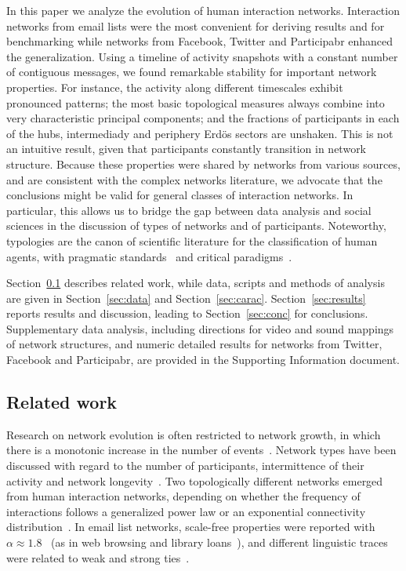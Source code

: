 \documentclass[%
	aip,
	jmp,%
	amsmath,amssymb,
	reprint,%
]{revtex4-1}
\begin{document}
In this paper we analyze the evolution of human interaction networks.
Interaction networks from email lists were the most convenient for deriving results and for benchmarking
while networks from Facebook, Twitter and Participabr enhanced the generalization.
Using a timeline of activity snapshots with a constant number of contiguous messages,
we found remarkable stability for important network properties.
For instance, the activity along different timescales exhibit pronounced patterns;
the most basic topological measures always combine into very characteristic principal components;
and the fractions of participants in each of the hubs, intermediady and periphery Erd\"os sectors
are unshaken.
This is not an intuitive result, given that participants constantly transition in network structure.
Because these properties were shared by networks from various sources,
and are consistent with the complex networks literature,
we advocate that the conclusions might be valid for general classes of interaction networks.
In particular, this allows us to 
bridge the gap between data analysis 
and social sciences in the discussion
of types of networks and of participants.
Noteworthy, typologies are the canon of scientific literature for the classification of human agents,
with pragmatic standards~\cite{myers} and critical paradigms~\cite{adorno,typCanon}. 

Section~\ref{sec:related} describes related work,
while data, scripts and methods of analysis are given in Section~\ref{sec:data} and Section~\ref{sec:carac}.
Section~\ref{sec:results} reports results and discussion, leading to Section~\ref{sec:conc} for conclusions.
Supplementary data analysis,
including directions for video and sound mappings of network structures,
and numeric detailed results for networks from Twitter, Facebook and Participabr,
are provided in the Supporting Information document.


\subsection{Related work}\label{sec:related}
Research on network evolution is often restricted to network growth, in which there is a monotonic increase in the number of events~\cite{barabasiEvo}.
Network types have been discussed with regard to the number of participants, intermittence of their activity and network longevity~\cite{barabasiEvo}. Two topologically different networks emerged from human interaction networks, depending on whether the frequency of interactions follows a generalized power law or an exponential connectivity distribution~\cite{barabasiTopologicalEv}. In email list networks, scale-free properties were reported with $\alpha \approx 1.8$~\cite{bird} (as in web browsing and library loans~\cite{barabasiHumanDyn}), and different linguistic traces were related to weak and strong ties~\cite{Gmane2}.
\end{document}

